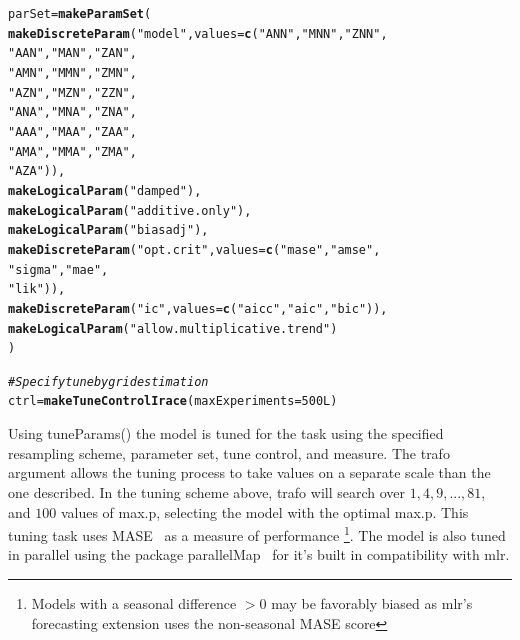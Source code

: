 \documentclass[12pt]{article}\usepackage[]{graphicx}\usepackage[]{color}
\makeatletter
\newcommand{\hlnum}[1]{\textcolor[rgb]{0.686,0.059,0.569}{#1}}%
\newcommand{\hlstr}[1]{\textcolor[rgb]{0.192,0.494,0.8}{#1}}%
\newcommand{\hlcom}[1]{\textcolor[rgb]{0.678,0.584,0.686}{\textit{#1}}}%
\newcommand{\hlstd}[1]{\textcolor[rgb]{0.345,0.345,0.345}{#1}}%
\newcommand{\hlkwb}[1]{\textcolor[rgb]{0.69,0.353,0.396}{#1}}%
\newcommand{\hlkwc}[1]{\textcolor[rgb]{0.333,0.667,0.333}{#1}}%
\newcommand{\hlkwd}[1]{\textcolor[rgb]{0.737,0.353,0.396}{\textbf{#1}}}%
\newenvironment{kframe}{%
 \def\at@end@of@kframe{}%
 \ifinner\ifhmode%
  \def\at@end@of@kframe{\end{minipage}}%
  \begin{minipage}{\columnwidth}%
 \fi\fi%
 \def\FrameCommand##1{\hskip\@totalleftmargin \hskip-\fboxsep
 \colorbox{shadecolor}{##1}\hskip-\fboxsep
     \hskip-\linewidth \hskip-\@totalleftmargin \hskip\columnwidth}%
 \MakeFramed {\advance\hsize-\width
   \@totalleftmargin\z@ \linewidth\hsize
   \@setminipage}}%
 {\par\unskip\endMakeFramed%
 \at@end@of@kframe}
\newenvironment{knitrout}{}{} %
\theoremstyle{definition}
\newcommand\code{\@codex}
\def\@codex#1{{\normalfont\ttfamily\hyphenchar\font=-1 #1}}
\newcommand{\pkg}[1]{{\fontseries{b}\selectfont #1}}
\makeatother
\begin{document}
\singlespacing                                      
\begin{knitrout}
\color{fgcolor}\begin{kframe}
\begin{alltt}
\hlstd{parSet} \hlkwb{=} \hlkwd{makeParamSet}\hlstd{(}
  \hlkwd{makeDiscreteParam}\hlstd{(}\hlstr{"model"}\hlstd{,} \hlkwc{values} \hlstd{=} \hlkwd{c}\hlstd{(}\hlstr{"ANN"}\hlstd{,} \hlstr{"MNN"}\hlstd{,} \hlstr{"ZNN"}\hlstd{,}
                                        \hlstr{"AAN"}\hlstd{,} \hlstr{"MAN"}\hlstd{,} \hlstr{"ZAN"}\hlstd{,}
                                        \hlstr{"AMN"}\hlstd{,} \hlstr{"MMN"}\hlstd{,} \hlstr{"ZMN"}\hlstd{,}
                                        \hlstr{"AZN"}\hlstd{,} \hlstr{"MZN"}\hlstd{,} \hlstr{"ZZN"}\hlstd{,}
                                        \hlstr{"ANA"}\hlstd{,} \hlstr{"MNA"}\hlstd{,} \hlstr{"ZNA"}\hlstd{,}
                                        \hlstr{"AAA"}\hlstd{,} \hlstr{"MAA"}\hlstd{,} \hlstr{"ZAA"}\hlstd{,}
                                        \hlstr{"AMA"}\hlstd{,} \hlstr{"MMA"}\hlstd{,} \hlstr{"ZMA"}\hlstd{,}
                                        \hlstr{"AZA"}\hlstd{)),}
  \hlkwd{makeLogicalParam}\hlstd{(}\hlstr{"damped"}\hlstd{),}
  \hlkwd{makeLogicalParam}\hlstd{(}\hlstr{"additive.only"}\hlstd{),}
  \hlkwd{makeLogicalParam}\hlstd{(}\hlstr{"biasadj"}\hlstd{),}
  \hlkwd{makeDiscreteParam}\hlstd{(}\hlstr{"opt.crit"}\hlstd{,} \hlkwc{values} \hlstd{=} \hlkwd{c}\hlstd{(}\hlstr{"mase"}\hlstd{,} \hlstr{"amse"}\hlstd{,}
                                           \hlstr{"sigma"}\hlstd{,} \hlstr{"mae"}\hlstd{,}
                                           \hlstr{"lik"}\hlstd{)),}
  \hlkwd{makeDiscreteParam}\hlstd{(}\hlstr{"ic"}\hlstd{,} \hlkwc{values} \hlstd{=} \hlkwd{c}\hlstd{(}\hlstr{"aicc"}\hlstd{,} \hlstr{"aic"}\hlstd{,} \hlstr{"bic"}\hlstd{)),}
  \hlkwd{makeLogicalParam}\hlstd{(}\hlstr{"allow.multiplicative.trend"}\hlstd{)}
\hlstd{)}

\hlcom{#Specify tune by grid estimation}
\hlstd{ctrl} \hlkwb{=} \hlkwd{makeTuneControlIrace}\hlstd{(}\hlkwc{maxExperiments} \hlstd{=} \hlnum{500L}\hlstd{)}
\end{alltt}
\end{kframe}
\end{knitrout}
\doublespacing

Using \code{tuneParams()} the model is tuned for the task using the specified resampling scheme, parameter set, tune control, and measure. The \code{trafo} argument allows the tuning process to take values on a separate scale than the one described. In the tuning scheme above, trafo will search over $1, 4, 9, ..., 81$, and $100$ values of \code{max.p}, selecting the model with the optimal \code{max.p}. This tuning task uses MASE~\cite{Hyndman2006} as a measure of performance \footnote{Models with a seasonal difference $> 0$ may be favorably biased as \pkg{mlr}'s forecasting extension uses the non-seasonal MASE score}. The model is also tuned in parallel using the package \pkg{parallelMap}~\cite{parallel} for it's built in compatibility with \pkg{mlr}.
\end{document}
